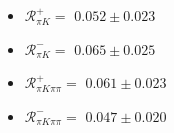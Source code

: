 \begin{itemize}
\item $\mathcal{R}^+_{\pi K} =$ $0.052 \pm 0.023$
\item $\mathcal{R}^-_{\pi K} =$ $0.065 \pm 0.025$
\item $\mathcal{R}^+_{\pi K\pi\pi} =$ $0.061 \pm 0.023$
\item $\mathcal{R}^-_{\pi K\pi\pi} =$ $0.047 \pm 0.020$
\end{itemize}
